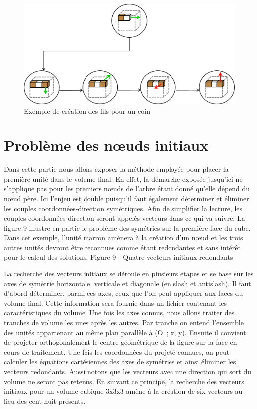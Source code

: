 \begin{figure}[h]
 \centering
 \includegraphics[scale=0.5,keepaspectratio=true]{img/buildCornerChildren.png}
 \caption{Exemple de création des fils pour un coin}
 \label{buildCornerChildren}
\end{figure}

\clearpage
\section{Problème des nœuds initiaux}
Dans cette partie nous allons exposer la méthode employée pour 	placer la première unité dans le volume final. En effet, la démarche exposée jusqu’ici ne s’applique pas pour les premiers nœuds de l’arbre étant donné qu’elle dépend du nœud père. Ici l’enjeu est double puisqu’il faut également déterminer et éliminer les couples coordonnées-direction symétriques. Afin de simplifier la lecture, les couples coordonnées-direction seront appelés vecteurs dans ce qui va suivre. La figure 9 illustre en partie le problème des symétries sur la première face du cube. Dans cet exemple, l’unité marron amènera à la création d’un nœud et les trois autres unités devront être reconnues comme étant redondantes et sans intérêt pour le calcul des solutions. 
Figure 9 - Quatre vecteurs initiaux redondants


La recherche des vecteurs initiaux se déroule en plusieurs étapes et se base sur les axes de symétrie horizontale, verticale et diagonale (en slash et antislash). Il faut d’abord déterminer, parmi ces axes, ceux que l’on peut appliquer aux faces du volume final. Cette information sera fournie dans un fichier contenant les caractéristiques du volume. Une fois les axes connus, nous allons traiter des tranches de volume les unes après les autres. Par tranche on entend l’ensemble des unités appartenant au même plan parallèle à (O ; x, y). Ensuite il convient de projeter orthogonalement le centre géométrique de la figure sur la face en cours de traitement. Une fois les coordonnées du projeté connues, on peut calculer les équations cartésiennes des axes de symétries et ainsi éliminer les vecteurs redondants. Aussi notons que les vecteurs avec une direction qui sort du volume ne seront pas retenus. En suivant ce principe, la recherche des vecteurs initiaux pour un volume cubique 3x3x3 amène à la création de six vecteurs au lieu des cent huit présents.
